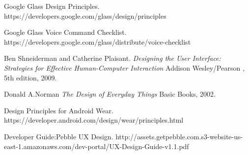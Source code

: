 \documentclass[11pt,a4paper]{scrartcl}
\begin{document}
\clearpage
\begin{thebibliography}{9}
 Google Glass Design Principles. 
https://developers.google.com/glass/design/principles

 Google Glass Voice Command Checklist.
 https://developers.google.com/glass/distribute/voice-checklist
 
Ben Shneiderman and Catherine Plaisant.   \emph{Designing the User Interface: Strategies for Effective Human-Computer Interaction}
  Addison Wesley/Pearson ,
  5th edition,
  2009.

Donald A.Norman \emph{The Design of Everyday Things}
  Basic Books,
  2002.
  
Design Principles for Android Wear.
https://developer.android.com/design/wear/principles.html


Developer Guide:Pebble UX Design.
http://assets.getpebble.com.s3-website-us-east-1.amazonaws.com/dev-portal/UX-Design-Guide-v1.1.pdf

\end{thebibliography}
\pagebreak
\end{document}
